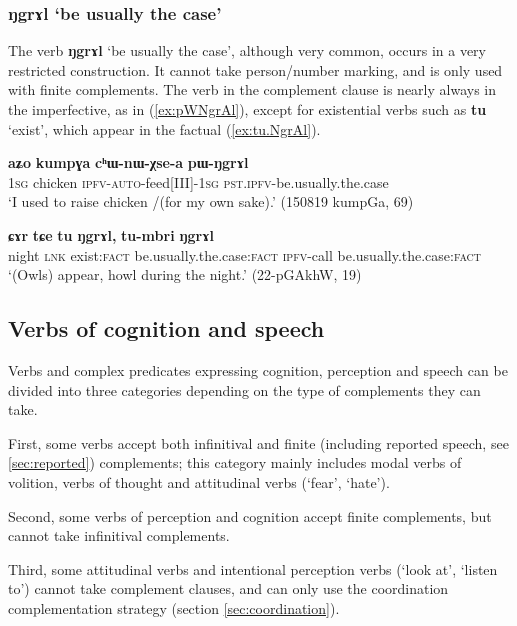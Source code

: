 \documentclass[oneside,a4paper,11pt]{article}
\newcommand{\ipa}[1]{\textbf{\phon#1}} %
\newcommand{\jpg}[2]{\ipa{#1} `#2'} %
\newcommand{\refb}[1]{(\ref{#1})}
\begin{document}
\subsubsection{\jpg{ŋgrɤl}{be usually the case}}
The verb \jpg{ŋgrɤl}{be usually the case}, although very common, occurs in a very restricted construction. It cannot take person/number marking, and is only used with finite complements. The verb in the complement clause is nearly always in the imperfective, as in \refb{ex:pWNgrAl}, except for existential verbs such as \jpg{tu}{exist}, which appear in the factual (\ref{ex:tu.NgrAl}).

\begin{exe}
\ex \label{ex:pWNgrAl}
 \gll \ipa{aʑo} 	\ipa{kumpɣa} 	\ipa{cʰɯ-nɯ-χse-a} 	\ipa{pɯ-ŋgrɤl}  \\
\textsc{1sg}  chicken \textsc{ipfv-auto}-feed[III]-\textsc{1sg} \textsc{pst.ipfv}-be.usually.the.case \\
\glt  `I used to raise chicken /(for my own sake).' (150819 kumpGa, 69)
\end{exe}
\begin{exe}
\ex \label{ex:tu.NgrAl}
 \gll
\ipa{ɕɤr} 	\ipa{tɕe} 	\ipa{tu} 	\ipa{ŋgrɤl,} 	\ipa{tu-mbri} 	\ipa{ŋgrɤl}  \\
night \textsc{lnk} exist:\textsc{fact} be.usually.the.case:\textsc{fact} \textsc{ipfv}-call be.usually.the.case:\textsc{fact} \\
\glt `(Owls) appear, howl during the night.' (22-pGAkhW, 19)
\end{exe}

\subsection{Verbs of cognition and speech} \label{sec:cognition}
Verbs and complex predicates expressing cognition, perception and speech can be divided into three categories depending on the type of complements they can take.

First, some verbs accept both infinitival and finite (including reported speech, see \ref{sec:reported}) complements; this category mainly includes modal verbs of volition, verbs of thought and attitudinal verbs (`fear', `hate').

Second, some verbs of perception and cognition accept finite complements, but cannot take infinitival complements.  

Third, some attitudinal verbs and intentional perception verbs (`look at', `listen to') cannot take complement clauses, and can only use the coordination complementation strategy (section  \ref{sec:coordination}).
 
\end{document}
